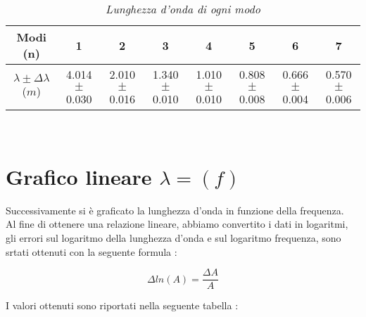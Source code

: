 \documentclass[12pt, a4paper]{article}
\begin{document}
 {
\renewcommand\arraystretch{1.2} %

\begin{table}[ht] %


\begin{tabular}{|c|c|c|c|c|c|c|c|} 
 
 \hline
  \small Modi (n) & 1 & 2 & 3 & 4 & 5 & 6 & 7\\
  
\hline

  
  \small $\lambda\pm\Delta\lambda$ ($m$) &\footnotesize{4.014$\pm$0.030}  &\footnotesize{2.010$\pm$0.016} &\footnotesize{1.340$\pm$0.010}&\footnotesize{1.010$\pm$0.010}&\footnotesize{0.808$\pm$0.008} &\footnotesize{0.666$\pm$0.004}&\footnotesize{0.570$\pm$0.006}\\
\hline


\end{tabular}\\
\caption{\small{\textit{Lunghezza d'onda di ogni modo} }}
    \label{tab:Lunghezza_d'onda}
\end{table}
}


\addvspace{1.5cm}
\section{Grafico lineare $\lambda=(f)$ }
Successivamente si è graficato la lunghezza d'onda in funzione della frequenza. 
\\
Al fine di ottenere una relazione lineare, abbiamo convertito i dati in logaritmi, gli errori sul logaritmo della lunghezza d'onda e sul logaritmo frequenza, sono srtati ottenuti con la seguente formula :

\begin{equation*}
    \Delta ln(A) = \frac{\Delta A}{A}
\end{equation*}

\newpage

I valori ottenuti sono riportati nella seguente tabella :
\end{document}
